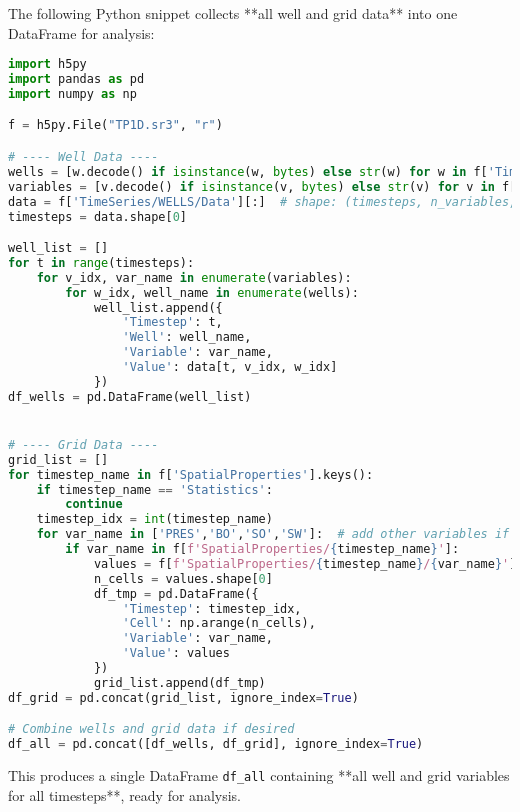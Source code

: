 \documentclass[12pt,a4paper]{article}
\begin{document}
The following Python snippet collects **all well and grid data** into one DataFrame for analysis:

\begin{lstlisting}[language=Python]
import h5py
import pandas as pd
import numpy as np

f = h5py.File("TP1D.sr3", "r")

# ---- Well Data ----
wells = [w.decode() if isinstance(w, bytes) else str(w) for w in f['TimeSeries/WELLS/Origins'][:]]
variables = [v.decode() if isinstance(v, bytes) else str(v) for v in f['TimeSeries/WELLS/Variables'][:]]
data = f['TimeSeries/WELLS/Data'][:]  # shape: (timesteps, n_variables, n_wells)
timesteps = data.shape[0]

well_list = []
for t in range(timesteps):
    for v_idx, var_name in enumerate(variables):
        for w_idx, well_name in enumerate(wells):
            well_list.append({
                'Timestep': t,
                'Well': well_name,
                'Variable': var_name,
                'Value': data[t, v_idx, w_idx]
            })
df_wells = pd.DataFrame(well_list)


# ---- Grid Data ----
grid_list = []
for timestep_name in f['SpatialProperties'].keys():
    if timestep_name == 'Statistics':
        continue
    timestep_idx = int(timestep_name)
    for var_name in ['PRES','BO','SO','SW']:  # add other variables if needed
        if var_name in f[f'SpatialProperties/{timestep_name}']:
            values = f[f'SpatialProperties/{timestep_name}/{var_name}'][:]
            n_cells = values.shape[0]
            df_tmp = pd.DataFrame({
                'Timestep': timestep_idx,
                'Cell': np.arange(n_cells),
                'Variable': var_name,
                'Value': values
            })
            grid_list.append(df_tmp)
df_grid = pd.concat(grid_list, ignore_index=True)

# Combine wells and grid data if desired
df_all = pd.concat([df_wells, df_grid], ignore_index=True)
\end{lstlisting}

This produces a single DataFrame \texttt{df\_all} containing **all well and grid variables for all timesteps**, ready for analysis.
\end{document}
